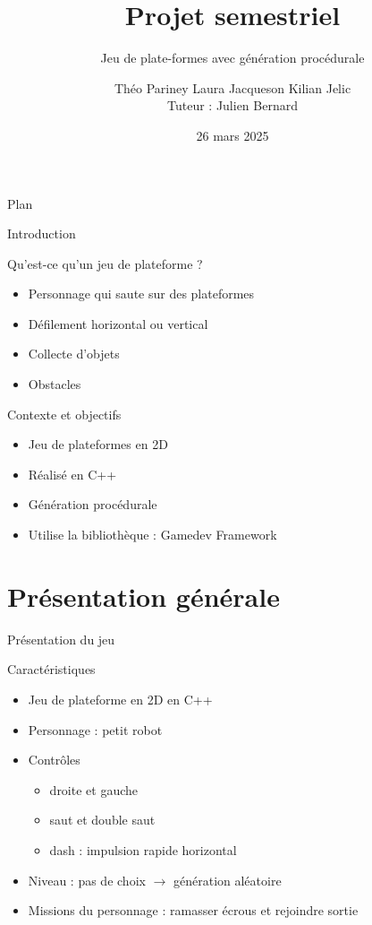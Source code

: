 \documentclass{beamer}
\title{Projet semestriel}
\subtitle{Jeu de plate-formes avec génération procédurale}
\author[T.Pariney L.Jaqueson K.Jelic]{Théo Pariney \newline Laura Jacqueson \newline Kilian Jelic\\\footnotesize Tuteur : Julien Bernard}
\institute[]{Université Marie et Louis Pasteur \\ \vspace{0.25cm} Licence 3 Informatique, 2024--2025}
\date{26 mars 2025}
\newcommand{\nologo}{\setbeamertemplate{logo}{}}
\begin{document}
\begin{frame}
    \titlepage
\end{frame}

{\nologo

\begin{frame}{Plan}
    \tableofcontents
\end{frame}

\begin{frame}{Introduction}
    \begin{block}{Qu'est-ce qu'un jeu de plateforme ?}
       \begin{itemize}
            \item[\bullet] Personnage qui saute sur des plateformes
            \item[\bullet] Défilement horizontal ou vertical
            \item[\bullet] Collecte d'objets
            \item[\bullet] Obstacles
        \end{itemize}
    \end{block}
    \begin{block}{Contexte et objectifs}
        \begin{itemize}
            \item[\bullet] Jeu de plateformes en 2D
            \item[\bullet] Réalisé en C++
            \item[\bullet] Génération procédurale
            \item[\bullet] Utilise la bibliothèque : Gamedev Framework
        \end{itemize}
    \end{block}
\end{frame}

\section{Présentation générale}
\begin{frame}{Présentation du jeu}
    \begin{block}{Caractéristiques}
        \begin{itemize}
            \item[\bullet] Jeu de plateforme en 2D en C++
            \item[\bullet] Personnage : petit robot
            \item[\bullet] Contrôles
            \begin{itemize}
                \item droite et gauche
                \item saut et double saut
                \item dash : impulsion rapide horizontal
            \end{itemize}
            \item[\bullet] Niveau : pas de choix $\rightarrow$ génération aléatoire
            \item[\bullet] Missions du personnage : ramasser écrous et rejoindre sortie
        \end{itemize}
    \end{block}
\end{frame}

}
\end{document}
